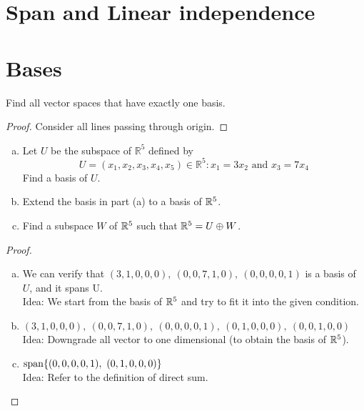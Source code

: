 \section{Span and Linear independence}

\section{Bases}


\begin{exercise}
Find all vector spaces that have exactly one basis.
\end{exercise}

\begin{proof}
	\par Consider all lines passing through origin.
\end{proof}

\begin{exercise}
\begin{enumerate}[(a)]
	\item Let $U$ be the subspace of $\mathbb{R}^5$ defined by
	      \[ U = {(x_1, x_2, x_3, x_4, x_5) \in \mathbb{R}^5 : x_1  = 3 x_2 \text{ and } x_3 = 7 x_4}\]
	      Find a basis of $U$.
	\item Extend the basis in part (a) to a basis of $\mathbb{R}^5$.
	\item Find a subspace $W$ of $\mathbb{R}^5$ such that \( \mathbb{R}^5 = U \oplus W\).
\end{enumerate}
\end{exercise}

\begin{proof}
	\begin{enumerate}[(a)]
		\item We can verify that \((3, 1, 0, 0, 0), ~ (0, 0, 7, 1, 0), ~ (0, 0, 0, 0, 1)\)
		      is a basis of $U$, and it spans U.
		      \\ Idea: We start from the basis of $\mathbb{R}^5$ and try to fit it into the given condition.

		\item \((3, 1, 0, 0, 0), ~ (0, 0, 7, 1, 0), ~ (0, 0, 0, 0, 1), ~ (0, 1, 0, 0, 0), ~ (0, 0, 1, 0, 0)\)
		      \\ Idea: Downgrade all vector to one dimensional (to obtain the basis of $\mathbb{R}^5$).

		\item \( \mathop{\mathrm{span}}\{(0, 0, 0, 0, 1), ~ (0, 1, 0, 0, 0)\} \)
		      \\ Idea: Refer to the definition of direct sum.
	\end{enumerate}
\end{proof}

